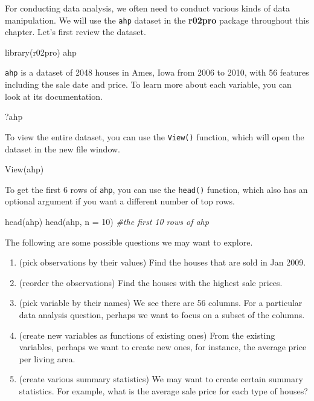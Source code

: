 \documentclass[
]{book}
\newenvironment{Shaded}{\begin{snugshade}}{\end{snugshade}}
\newcommand{\AttributeTok}[1]{\textcolor[rgb]{0.77,0.63,0.00}{#1}}
\newcommand{\CommentTok}[1]{\textcolor[rgb]{0.56,0.35,0.01}{\textit{#1}}}
\newcommand{\DecValTok}[1]{\textcolor[rgb]{0.00,0.00,0.81}{#1}}
\newcommand{\FunctionTok}[1]{\textcolor[rgb]{0.00,0.00,0.00}{#1}}
\newcommand{\NormalTok}[1]{#1}
\begin{document}
For conducting data analysis, we often need to conduct various kinds of data manipulation. We will use the \texttt{ahp} dataset in the \textbf{r02pro} package throughout this chapter. Let's first review the dataset.

\begin{Shaded}
\begin{Highlighting}[]
\FunctionTok{library}\NormalTok{(r02pro)}
\NormalTok{ahp}
\end{Highlighting}
\end{Shaded}

\texttt{ahp} is a dataset of 2048 houses in Ames, Iowa from 2006 to 2010, with 56 features including the sale date and price. To learn more about each variable, you can look at its documentation.

\begin{Shaded}
\begin{Highlighting}[]
\NormalTok{?ahp}
\end{Highlighting}
\end{Shaded}

To view the entire dataset, you can use the \texttt{View()} function, which will open the dataset in the new file window.

\begin{Shaded}
\begin{Highlighting}[]
\FunctionTok{View}\NormalTok{(ahp)}
\end{Highlighting}
\end{Shaded}

To get the first 6 rows of \texttt{ahp}, you can use the \texttt{head()} function, which also has an optional argument if you want a different number of top rows.

\begin{Shaded}
\begin{Highlighting}[]
\FunctionTok{head}\NormalTok{(ahp)}
\FunctionTok{head}\NormalTok{(ahp, }\AttributeTok{n =} \DecValTok{10}\NormalTok{) }\CommentTok{\#the first 10 rows of ahp}
\end{Highlighting}
\end{Shaded}

The following are some possible questions we may want to explore.

\begin{enumerate}
\def\labelenumi{\arabic{enumi}.}
\item
  (pick observations by their values) Find the houses that are sold in Jan 2009.
\item
  (reorder the observations) Find the houses with the highest sale prices.
\item
  (pick variable by their names) We see there are 56 columns. For a particular data analysis question, perhaps we want to focus on a subset of the columns.
\item
  (create new variables as functions of existing ones) From the existing variables, perhaps we want to create new ones, for instance, the average price per living area.
\item
  (create various summary statistics) We may want to create certain summary statistics. For example, what is the average sale price for each type of houses?
\end{enumerate}
\end{document}
